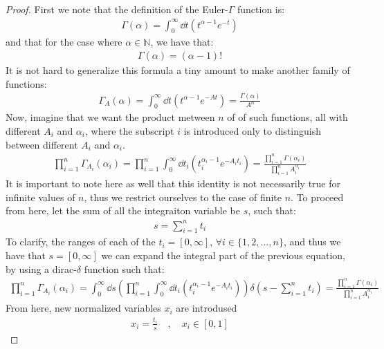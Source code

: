\documentclass[a4paper,twoside]{article}
\begin{document}
\begin{proof}
First we note that the definition of the Euler-$\Gamma$ function is:
\begin{align*}
\Gamma(\alpha) = \int_{0}^{\infty} \dd{t} \left( t^{\alpha - 1} e^{-t} \right)
\end{align*}
and that for the case where $\alpha \in \mathbb{N}$, we have that:
\begin{align*}
\Gamma(\alpha) = (\alpha - 1)!
\end{align*}
It is not hard to generalize this formula a tiny amount to make another family of functions:
\begin{align*}
\Gamma_{A}(\alpha) = \int_{0}^{\infty} \dd{t} \left( t^{\alpha - 1} e^{-At} \right) = \frac{\Gamma(\alpha)}{A^{\alpha}}
\end{align*}
Now, imagine that we want the product metween $n$ of of such functions, all with different $A_{i}$ and $\alpha_{i}$, where the subscript $i$ is introduced only to distinguish between different $A_{i}$ and $\alpha_{i}$.
\begin{align*}
\prod_{i=1}^{n}\Gamma_{A_{i}}(\alpha_{i}) = \prod_{i=1}^{n} \int_{0}^{\infty} \dd{t_{i}} \left( t_{i}^{\alpha_{i} - 1} e^{-A_{i}t_{i}} \right) = \frac{\prod_{i=1}^{n}\Gamma(\alpha_{i})}{\prod_{i=1}^{n}A_{i}^{\alpha_{i}}}
\end{align*}
It is important to note here as well that this identity is not necessarily true for infinite values of $n$, thus we restrict ourselves to the case of finite $n$.
To proceed from here, let the sum of all the integraiton variable be $s$, such that:
\begin{align*}
s = \sum_{i=1}^{n}t_{i}
\end{align*}
To clarify, the ranges of each of the $t_{i} = [0, \infty]$, $\forall i \in \{1, 2, ... , n\}$, and thus we have that $s = [0, \infty]$
we can expand the integral part of the previous equation, by using a dirac-$\delta$ function such that:
\begin{align*}
\prod_{i=1}^{n}\Gamma_{A_{i}}(\alpha_{i}) 
= \int_{0}^{\infty} \dd{s} \left( \prod_{i=1}^{n} \int_{0}^{\infty} \dd{t_{i}} \left( t_{i}^{\alpha_{i} - 1} e^{-A_{i}t_{i}} \right) \right) \delta \left(s - \sum_{i=1}^{n}t_{i}\right) 
= \frac{\prod_{i=1}^{n}\Gamma(\alpha_{i})}{\prod_{i=1}^{n}A_{i}^{\alpha_{i}}}
\end{align*}
From here, new normalized variables $x_{i}$ are introdused
\begin{align*}
x_{i} = \frac{t_{i}}{s} \quad , \quad x_{i} \in [0, 1]
\end{align*}

\end{proof}
\end{document}
